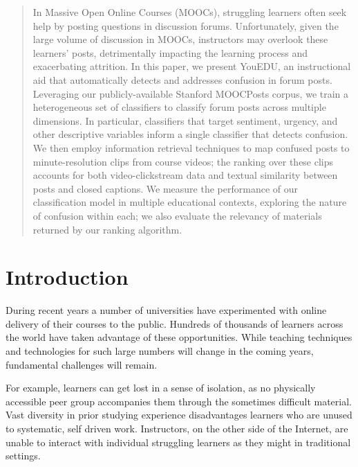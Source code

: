 \documentclass{edm_template}
\begin{document}
\maketitle
\begin{abstract}
In Massive Open Online Courses (MOOCs), struggling learners often seek help by
posting questions in discussion forums. Unfortunately, given the large volume of discussion in MOOCs, instructors may overlook these learners' posts,
detrimentally impacting the learning process and exacerbating attrition. In this paper, we present YouEDU, an instructional aid that automatically detects and addresses confusion in forum posts. Leveraging our publicly-available Stanford MOOCPosts corpus, we train a heterogeneous set of classifiers to classify forum posts across multiple dimensions. In particular, classifiers that target sentiment, urgency, and other descriptive variables inform a single classifier that detects confusion. We then employ information retrieval techniques to map confused posts to minute-resolution clips from course videos; the ranking over these clips accounts for both video-clickstream data and textual similarity between posts and closed captions. We measure the performance of our classification model in multiple educational contexts, exploring the nature of confusion within each; we also evaluate the relevancy of materials returned by our ranking algorithm.
\end{abstract}

%

\section{Introduction}
\label{sec:intro}

During recent years a number of universities have experimented with
online delivery of their courses to the public. Hundreds of thousands
of learners across the world have taken advantage of these
opportunities.  While teaching techniques and technologies for such
large numbers will change in the coming years, fundamental challenges
will remain. 

For example, learners can get lost in a sense of isolation, as no
physically accessible peer group accompanies them through the
sometimes difficult material. Vast diversity in prior studying
experience disadvantages learners who are unused to systematic, self
driven work. Instructors, on the other side of the Internet, are
unable to interact with individual struggling learners as they might
in traditional settings.
\end{document}
